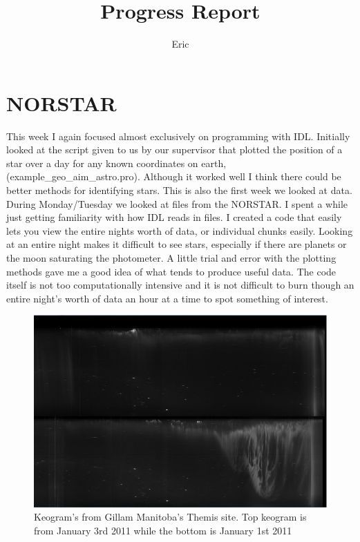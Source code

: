 \documentclass[11pt]{article}
\title{Progress Report}
\author{Eric}
\begin{document}
\maketitle
\medskip
\section{NORSTAR}
\hspace{0.5cm}

This week I again focused almost exclusively on programming with IDL. Initially looked at the script given to us by our supervisor that plotted the position of a star over a day for any known coordinates on earth, (example\_geo\_aim\_astro.pro). Although it worked well I think there could be better methods for identifying stars. This is also the first week we looked at data. During Monday/Tuesday we looked at files from the NORSTAR. I spent a while just getting familiarity with how IDL reads in files.  I created a code that easily lets you view the entire nights worth of data, or individual chunks easily. Looking at an entire night makes it difficult to see stars, especially if there are planets or the moon saturating the photometer. A little trial and error with the plotting methods gave me a good idea of what tends to produce useful data. The code itself is not too computationally intensive and it is not difficult to burn though an entire night's worth of data an hour at a time to spot something of interest.

\begin{figure}[t!]
\includegraphics[scale=0.8]{keograms.jpg}
\caption{Keogram's from Gillam Manitoba's Themis site. Top keogram is from January 3rd 2011 while the bottom is January 1st 2011}
\end{figure}
\end{document}
